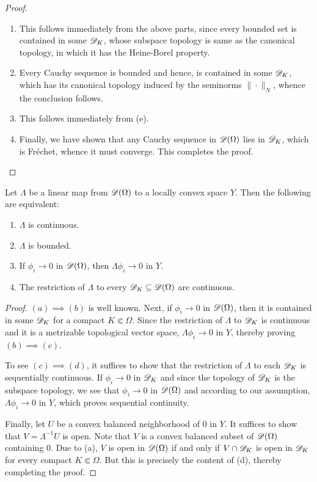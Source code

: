\begin{proof}
\begin{enumerate}[label=(\alph*)]
\item This follows immediately from the above parts, since every bounded set is contained in some $\mathscr{D}_K$, whose subspace topology is same as the canonical topology, in which it has the Heine-Borel property.

\item Every Cauchy sequence is bounded and hence, is contained in some $\mathscr{D}_K$, which has its canonical topology induced by the seminorms $\|\cdot\|_N$, whence the conclusion follows. 

\item This follows immediately from (e). 

\item Finally, we have shown that any Cauchy sequence in $\mathscr{D}(\Omega)$ lies in $\mathscr{D}_K$, which is Fr\'echet, whence it must converge. This completes the proof. \qedhere
\end{enumerate}
\end{proof}

\begin{theorem}
    Let $\Lambda$ be a linear map from $\mathscr{D}(\Omega)$ to a locally convex space $Y$. Then the following are equivalent:
    \begin{enumerate}[label=(\alph*)]
        \item $\Lambda$ is continuous. 
        \item $\Lambda$ is bounded. 
        \item If $\phi_i\to 0$ in $\mathscr{D}(\Omega)$, then $\Lambda\phi_i\to 0$ in $Y$. 
        \item The restriction of $\Lambda$ to every $\mathscr{D}_K\subseteq\mathscr{D}(\Omega)$ are continuous.
    \end{enumerate}
\end{theorem}
\begin{proof}
$(a)\implies(b)$ is well known. Next, if $\phi_i\to 0$ in $\mathscr{D}(\Omega)$, then it is contained in some $\mathscr{D}_K$ for a compact $K\Subset\Omega$. Since the restriction of $\Lambda$ to $\mathscr{D}_K$ is continuous and it is a metrizable topological vector space, $\Lambda\phi_i\to 0$ in $Y$, thereby proving $(b)\implies(c)$.

To see $(c)\implies(d)$, it suffices to show that the restriction of $\Lambda$ to each $\mathscr{D}_K$ is sequentially continuous. If $\phi_i\to 0$ in $\mathscr{D}_K$ and since the topology of $\mathscr{D}_K$ is the subspace topology, we see that $\phi_i\to 0$ in $\mathscr{D}(\Omega)$ and according to our assumption, $\Lambda\phi_i\to 0$ in $Y$, which proves sequential continuity.

Finally, let $U$ be a convex balanced neighborhood of $0$ in $Y$. It suffices to show that $V = \Lambda^{-1}U$ is open. Note that $V$ is a convex balanced subset of $\mathscr{D}(\Omega)$ containing $0$. Due to  (a), $V$ is open in $\mathscr{D}(\Omega)$ if and only if $V\cap\mathscr{D}_K$ is open in $\mathscr{D}_K$ for every compact $K\Subset\Omega$. But this is precisely the content of (d), thereby completing the proof.
\end{proof}

